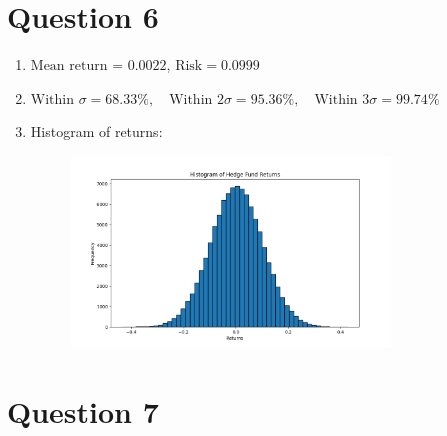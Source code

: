 \documentclass[a4paper]{article}
\begin{document}
\vspace{5mm}

\section*{Question 6}

\begin{enumerate}[label=(\alph*)]
    \item $\text{Mean return = }0.0022$, $\text{Risk} = 0.0999$

    \item $\text{Within } \sigma = 68.33\%, \quad \text{Within } 2\sigma = 95.36\%, \quad \text{Within } 3\sigma = 99.74\%$

    \item Histogram of returns:
    \begin{figure}[h]
        \centering
        \includegraphics[width=0.8\textwidth]{q6.png}
    \end{figure}
\end{enumerate}

\newpage
\section*{Question 7}


\end{document}
